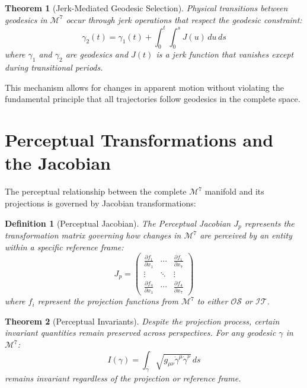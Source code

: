 \documentclass{article}
\newtheorem{definition}{Definition}
\newtheorem{theorem}{Theorem}
\begin{document}
\begin{theorem}[Jerk-Mediated Geodesic Selection]
Physical transitions between geodesics in $\mathcal{M}^7$ occur through jerk operations that respect the geodesic constraint:
\begin{equation}
\gamma_2(t) = \gamma_1(t) + \int_0^t \int_0^s J(u) \, du \, ds
\end{equation}
where $\gamma_1$ and $\gamma_2$ are geodesics and $J(t)$ is a jerk function that vanishes except during transitional periods.
\end{theorem}

This mechanism allows for changes in apparent motion without violating the fundamental principle that all trajectories follow geodesics in the complete space.

\section{Perceptual Transformations and the Jacobian}

The perceptual relationship between the complete $\mathcal{M}^7$ manifold and its projections is governed by Jacobian transformations:

\begin{definition}[Perceptual Jacobian]
The Perceptual Jacobian $J_p$ represents the transformation matrix governing how changes in $\mathcal{M}^7$ are perceived by an entity within a specific reference frame:
\begin{equation}
J_p = \begin{pmatrix}
\frac{\partial f_1}{\partial x_1} & \cdots & \frac{\partial f_1}{\partial x_7} \\
\vdots & \ddots & \vdots \\
\frac{\partial f_4}{\partial x_1} & \cdots & \frac{\partial f_4}{\partial x_7}
\end{pmatrix}
\end{equation}
where $f_i$ represent the projection functions from $\mathcal{M}^7$ to either $\mathcal{OS}$ or $\mathcal{IT}$.
\end{definition}

\begin{theorem}[Perceptual Invariants]
Despite the projection process, certain invariant quantities remain preserved across perspectives. For any geodesic $\gamma$ in $\mathcal{M}^7$:
\begin{equation}
I(\gamma) = \int_{\gamma} \sqrt{g_{\mu\nu}\dot{\gamma}^\mu\dot{\gamma}^\nu} \, ds
\end{equation}
remains invariant regardless of the projection or reference frame.
\end{theorem}
\end{document}
